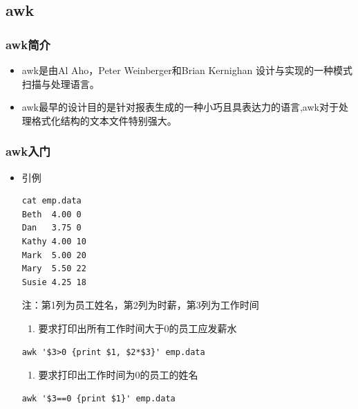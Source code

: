 \documentclass[xcolor=svgnames,presentation]{beamer}
\begin{document}
\subsection{awk}
\label{sec-2-2}
\begin{frame}
\frametitle{awk简介}
\label{sec-2-2-1}
\begin{itemize}

\item awk是由Al Aho，Peter Weinberger和Brian Kernighan 设计与实现的一种模式扫描与处理语言。
\label{sec-2-2-1-1}%

\item awk最早的设计目的是针对报表生成的一种小巧且具表达力的语言,awk对于处理格式化结构的文本文件特别强大。
\label{sec-2-2-1-2}%
\end{itemize} %
\end{frame}
\begin{frame}[fragile]
\frametitle{awk入门}
\label{sec-2-2-2}
\begin{itemize}

\item 引例\\
\label{sec-2-2-2-1}%
\begin{verbatim}
cat emp.data
Beth  4.00 0
Dan   3.75 0
Kathy 4.00 10
Mark  5.00 20
Mary  5.50 22
Susie 4.25 18
\end{verbatim}
注：第1列为员工姓名，第2列为时薪，第3列为工作时间

\begin{enumerate}
\item 要求打印出所有工作时间大于0的员工应发薪水
\end{enumerate}

\begin{verbatim}
awk '$3>0 {print $1, $2*$3}' emp.data
\end{verbatim}
\begin{enumerate}
\item 要求打印出工作时间为0的员工的姓名
\end{enumerate}

\begin{verbatim}
awk '$3==0 {print $1}' emp.data
\end{verbatim}
\end{itemize} %
\end{frame}
\end{document}
